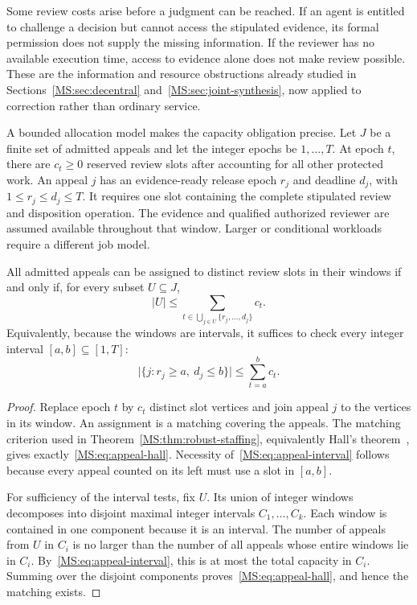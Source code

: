 Some review costs arise before a judgment can be reached. If an agent is entitled to challenge a decision but cannot access the stipulated evidence, its formal permission does not supply the missing information. If the reviewer has no available execution time, access to evidence alone does not make review possible. These are the information and resource obstructions already studied in Sections~\ref{MS:sec:decentral} and~\ref{MS:sec:joint-synthesis}, now applied to correction rather than ordinary service.

A bounded allocation model makes the capacity obligation precise. Let $J$ be a finite set of admitted appeals and let the integer epochs be $1,\ldots,T$. At epoch $t$, there are $c_t\ge0$ reserved review slots after accounting for all other protected work. An appeal $j$ has an evidence-ready release epoch $r_j$ and deadline $d_j$, with $1\le r_j\le d_j\le T$. It requires one slot containing the complete stipulated review and disposition operation. The evidence and qualified authorized reviewer are assumed available throughout that window. Larger or conditional workloads require a different job model.

\begin{MSproposition}\label{MS:prop:appeal-capacity}
All admitted appeals can be assigned to distinct review slots in their windows if and only if, for every subset $U\subseteq J$,
\begin{equation}\label{MS:eq:appeal-hall}
 |U|\le\sum_{t\in\bigcup_{j\in U}\{r_j,\ldots,d_j\}}c_t.
\end{equation}
Equivalently, because the windows are intervals, it suffices to check every integer interval $[a,b]\subseteq[1,T]$:
\begin{equation}\label{MS:eq:appeal-interval}
 \bigl|\{j:r_j\ge a,\ d_j\le b\}\bigr|
       \le\sum_{t=a}^{b}c_t.
\end{equation}
\end{MSproposition}
\begin{proof}
Replace epoch $t$ by $c_t$ distinct slot vertices and join appeal $j$ to the vertices in its window. An assignment is a matching covering the appeals. The matching criterion used in Theorem~\ref{MS:thm:robust-staffing}, equivalently Hall's theorem~\cite{MS:hall1935}, gives exactly~\eqref{MS:eq:appeal-hall}. Necessity of~\eqref{MS:eq:appeal-interval} follows because every appeal counted on its left must use a slot in $[a,b]$.

For sufficiency of the interval tests, fix $U$. Its union of integer windows decomposes into disjoint maximal integer intervals $C_1,\ldots,C_k$. Each window is contained in one component because it is an interval. The number of appeals from $U$ in $C_i$ is no larger than the number of all appeals whose entire windows lie in $C_i$. By~\eqref{MS:eq:appeal-interval}, this is at most the total capacity in $C_i$. Summing over the disjoint components proves~\eqref{MS:eq:appeal-hall}, and hence the matching exists.
\end{proof}

